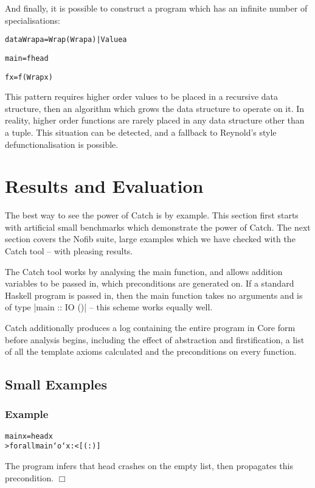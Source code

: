 \documentclass[preprint]{sigplanconf}
\newcommand{\C}[1]{\textsf{#1}}
\newcounter{exmp}
\newcommand{\yesexample}{\subsubsection*{Example \arabic{exmp}}\addtocounter{exmp}{1}}
\newcommand{\noexample}{\hfill$\Box$}
\newenvironment{code}{\begin{alltt}\small}{\end{alltt}}
\newenvironment{example}{\yesexample}{\noexample}
\begin{document}
And finally, it is possible to construct a program which has an infinite number of specialisations:

\begin{code}
data Wrap a = Wrap (Wrap a) | Value a

main = f head

f x = f (Wrap x)
\end{code}

This pattern requires higher order values to be placed in a recursive data structure, then an algorithm which grows the data structure to operate on it. In reality, higher order functions are rarely placed in any data structure other than a tuple. This situation can be detected, and a fallback to Reynold's style defunctionalisation is possible.

\section{Results and Evaluation}
\label{sec:results}

The best way to see the power of Catch is by example. This section first starts with artificial small benchmarks which demonstrate the power of Catch. The next section covers the Nofib suite, large examples which we have checked with the Catch tool -- with pleasing results.

The Catch tool works by analysing the \C{main} function, and allows addition variables to be passed in, which preconditions are generated on. If a standard Haskell program is passed in, then the \C{main} function takes no arguments and is of type |main :: IO ()| -- this scheme works equally well.

Catch additionally produces a log containing the entire program in Core form before analysis begins, including the effect of abstraction and firstification, a list of all the template axioms calculated and the preconditions on every function.

\subsection{Small Examples}

\begin{example}
\begin{code}
main x = head x
> forall main `o` x :< [ (:) ]
\end{code}

The program infers that \C{head} crashes on the empty list, then propagates this precondition.
\end{example}
\end{document}
